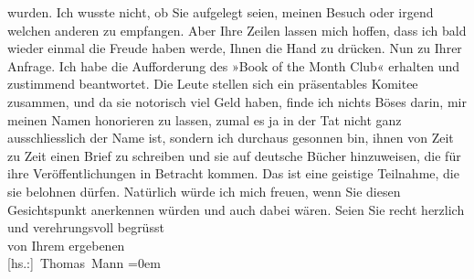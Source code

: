 \begin{ledgroupsized}[t]{13cm}
               wurden. Ich wusste nicht, ob Sie aufgelegt seien, meinen Besuch oder irgend welchen
               anderen zu empfangen. Aber Ihre Zeilen lassen mich hoffen, dass ich bald wieder
               einmal die Freude haben werde, Ihnen die Hand zu drücken.\pend
           \pstart
           Nun zu Ihrer Anfrage. Ich habe die Aufforderung des »Book
                  of the Month Club« erhalten und zustimmend beantwortet. Die Leute stellen
               sich ein präsentables Komitee zusammen, und da sie notorisch viel Geld haben, finde
               ich nichts Böses darin, mir meinen Namen honorieren zu lassen, zumal es ja in der Tat
               nicht ganz ausschliesslich der Name ist, sondern ich durchaus gesonnen bin, ihnen von
               Zeit zu Zeit einen Brief zu schreiben und sie auf deutsche Bücher hinzuweisen, die
               für ihre Veröffentlichungen in Betracht kommen. Das ist eine geistige Teilnahme, die
               sie belohnen {\pb}dürfen. Natürlich würde ich
               mich freuen, wenn Sie diesen Gesichtspunkt anerkennen würden und auch dabei
               wären.\pend
           \pstart
           Seien Sie recht herzlich und verehrungsvoll begrüsst{\\[\baselineskip]} von Ihrem ergebenen{\\[\baselineskip]}\spacefill\mbox{{[}hs.:{]} Thomas Mann}\pend
           \leftskip=0em{}\endnumbering{}\end{ledgroupsized}  \newcommand{\dateiname}{L02508}\newcommand{\titel}{Thomas Mann an Arthur Schnitzler, 1. 2. 1929}\newcommand{\editorInnen}{Martin Anton Müller und Gerd-Hermann Susen}
      